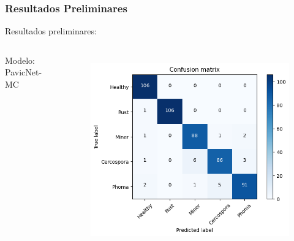 \documentclass[aspectratio=169]{beamer}
\begin{document}
\begin{frame}
    \frametitle{Resultados Preliminares}

    \centering
    Resultados preliminares:

    \begin{columns}



        \centering
        \tiny Modelo: PavicNet-MC
        \begin{figure}
            \centering
            \includegraphics[scale=0.39]{img/Pavicnetresult1.png}
            \label{fig:enter-label}
        \end{figure}
        \centering




\end{columns}
\end{frame}
\end{document}
